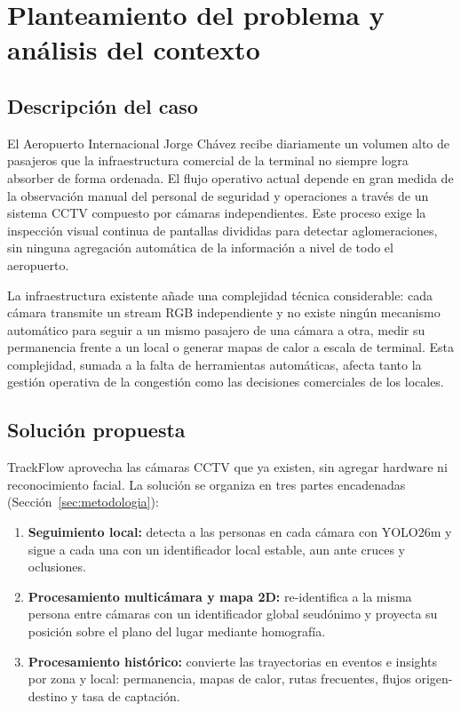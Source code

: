 \documentclass[12pt,a4paper]{article}
\begin{document}
\section{Planteamiento del problema y análisis del contexto}

\subsection{Descripción del caso}

El Aeropuerto Internacional Jorge Chávez recibe diariamente un volumen
alto de pasajeros que la infraestructura comercial de la terminal no
siempre logra absorber de forma ordenada. El flujo operativo actual
depende en gran medida de la observación manual del personal de
seguridad y operaciones a través de un sistema CCTV compuesto por
cámaras independientes. Este proceso exige la inspección visual
continua de pantallas divididas para detectar aglomeraciones, sin ninguna
agregación automática de la información a nivel de todo el aeropuerto.

La infraestructura existente añade una complejidad técnica considerable:
cada cámara transmite un stream RGB independiente y no existe ningún
mecanismo automático para seguir a un mismo pasajero de una cámara a otra,
medir su permanencia frente a un local o generar mapas de calor a escala de
terminal. Esta complejidad, sumada a la falta de herramientas
automáticas, afecta tanto la gestión operativa de la congestión como las
decisiones comerciales de los locales.

\subsection{Solución propuesta}
\label{sec:solucion}

TrackFlow aprovecha las cámaras CCTV que ya existen, sin agregar hardware ni
reconocimiento facial. La solución se organiza en tres partes encadenadas
(Sección~\ref{sec:metodologia}):

\begin{enumerate}
    \item \textbf{Seguimiento local:} detecta a las personas en cada cámara
    con YOLO26m y sigue a cada una con un identificador local estable, aun
    ante cruces y oclusiones.
    \item \textbf{Procesamiento multicámara y mapa 2D:} re-identifica a la
    misma persona entre cámaras con un identificador global seudónimo y
    proyecta su posición sobre el plano del lugar mediante homografía.
    \item \textbf{Procesamiento histórico:} convierte las trayectorias en
    eventos e insights por zona y local: permanencia, mapas de calor, rutas
    frecuentes, flujos origen-destino y tasa de captación.
\end{enumerate}
\end{document}
